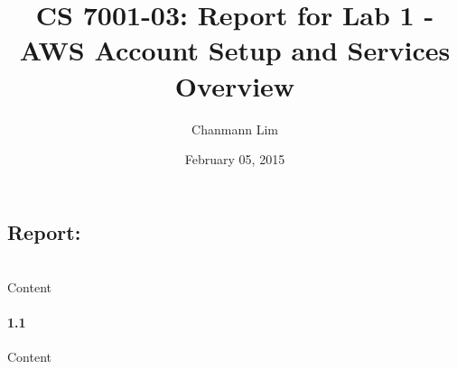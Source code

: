 \documentclass[a4paper]{article}
\begin{document}
\title{CS 7001-03: Report for Lab 1 - AWS Account Setup and Services Overview}
\author{Chanmann Lim}
\date{February 05, 2015}
\maketitle

\subsection*{Report:} ~\\
\indent Content \\

\paragraph{1.1 } Content \\
\end{document}
